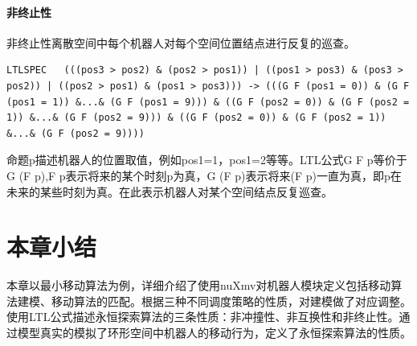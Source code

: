 \paragraph{非终止性}
非终止性离散空间中每个机器人对每个空间位置结点进行反复的巡查。

\begin{lstlisting}
LTLSPEC   (((pos3 > pos2) & (pos2 > pos1)) | ((pos1 > pos3) & (pos3 > pos2)) | ((pos2 > pos1) & (pos1 > pos3))) -> (((G F (pos1 = 0)) & (G F (pos1 = 1)) &...& (G F (pos1 = 9))) & ((G F (pos2 = 0)) & (G F (pos2 = 1)) &...& (G F (pos2 = 9))) & ((G F (pos2 = 0)) & (G F (pos2 = 1)) &...& (G F (pos2 = 9))))
\end{lstlisting}

命题p描述机器人的位置取值，例如pos1=1，pos1=2等等。LTL公式G F p等价于G (F p),F p表示将来的某个时刻p为真，G (F p)表示将来(F p)一直为真，即p在未来的某些时刻为真。在此表示机器人对某个空间结点反复巡查。

\section{本章小结}
本章以最小移动算法为例，详细介绍了使用nuXmv对机器人模块定义包括移动算法建模、移动算法的匹配。根据三种不同调度策略的性质，对建模做了对应调整。使用LTL公式描述永恒探索算法的三条性质：非冲撞性、非互换性和非终止性。通过模型真实的模拟了环形空间中机器人的移动行为，定义了永恒探索算法的性质。

